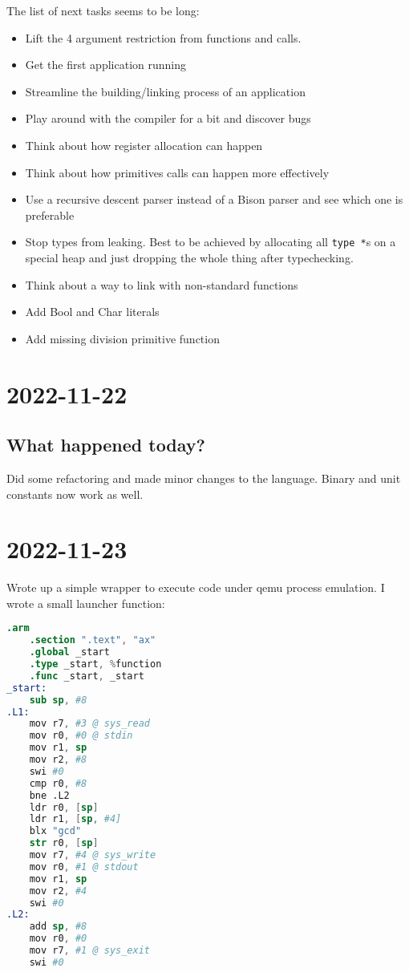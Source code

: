 \documentclass[12pt, article]{article}
\begin{document}
The list of next tasks seems to be long:
\begin{itemize}
\item Lift the 4 argument restriction from functions and calls.
\item Get the first application running
\item Streamline the building/linking process of an application
\item Play around with the compiler for a bit and discover bugs
\item Think about how register allocation can happen
\item Think about how primitives calls can happen more effectively
\item Use a recursive descent parser instead of a Bison parser and see
  which one is preferable
\item Stop types from leaking. Best to be achieved by allocating all
  \texttt{type *}s on a special heap and just dropping the whole thing
  after typechecking.
\item Think about a way to link with non-standard functions
\item Add Bool and Char literals
\item Add missing division primitive function
\end{itemize}

\section{2022-11-22}

\subsection{What happened today?}

Did some refactoring and made minor changes to the language.
Binary and unit constants now work as well.

\section{2022-11-23}

Wrote up a simple wrapper to execute code under qemu process
emulation.
I wrote a small launcher function:
\begin{lstlisting}[language=Assembler]
	.arm
	.section ".text", "ax"
	.global _start
	.type _start, %function
	.func _start, _start
_start:
	sub sp, #8
.L1:
	mov r7, #3 @ sys_read
	mov r0, #0 @ stdin
	mov r1, sp
	mov r2, #8
	swi #0
	cmp r0, #8
	bne .L2
	ldr r0, [sp]
	ldr r1, [sp, #4]
	blx "gcd"
	str r0, [sp]
	mov r7, #4 @ sys_write
	mov r0, #1 @ stdout
	mov r1, sp
	mov r2, #4
	swi #0
.L2:
	add sp, #8
	mov r0, #0
	mov r7, #1 @ sys_exit
	swi #0
\end{lstlisting}
\end{document}

